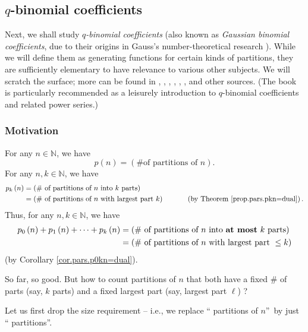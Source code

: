 \subsection{$q$-binomial coefficients}

Next, we shall study $q$\emph{-binomial coefficients} (also known as
\emph{Gaussian binomial coefficients}, due to their origins in Gauss's
number-theoretical research \cite[\S 5]{Gauss08}). While we will define them
as generating functions for certain kinds of partitions, they are sufficiently
elementary to have relevance to various other subjects. We will scratch the
surface; more can be found in \cite[Chapters 5--7]{KacChe02}, \cite[Chapter
2]{KliSch97}, \cite[Chapter 5]{Wagner08}, \cite[\S 11.3--11.11]{Wagner20},
\cite[spread across the text]{Stanley-EC1}, \cite[\S 2.6]{GouJac83},
\cite{Johnso20} and other sources. (The book \cite{Johnso20} is particularly
recommended as a leisurely introduction to $q$-binomial coefficients and
related power series.)

\subsubsection{\label{subsec.qbin.motiv}Motivation}

For any $n\in\mathbb{N}$, we have%
\[
p\left(  n\right)  =\left(  \text{\# of partitions of }n\right)  .
\]
For any $n,k\in\mathbb{N}$, we have%
\begin{align*}
p_{k}\left(  n\right)   &  =\left(  \text{\# of partitions of }n\text{ into
}k\text{ parts}\right) \\
&  =\left(  \text{\# of partitions of }n\text{ with largest part }k\right)
\ \ \ \ \ \ \ \ \ \ \left(  \text{by Theorem \ref{prop.pars.pkn=dual}}\right)
.
\end{align*}
Thus, for any $n,k\in\mathbb{N}$, we have%
\begin{align*}
p_{0}\left(  n\right)  +p_{1}\left(  n\right)  +\cdots+p_{k}\left(  n\right)
&  =\left(  \text{\# of partitions of }n\text{ into \textbf{at most} }k\text{
parts}\right) \\
&  =\left(  \text{\# of partitions of }n\text{ with largest part }\leq
k\right)
\end{align*}
(by Corollary \ref{cor.pars.p0kn=dual}).

So far, so good. But how to count partitions of $n$ that both have a fixed \#
of parts (say, $k$ parts) and a fixed largest part (say, largest part $\ell$) ?

Let us first drop the size requirement -- i.e., we replace \textquotedblleft
partitions of $n$\textquotedblright\ by just \textquotedblleft
partitions\textquotedblright.

